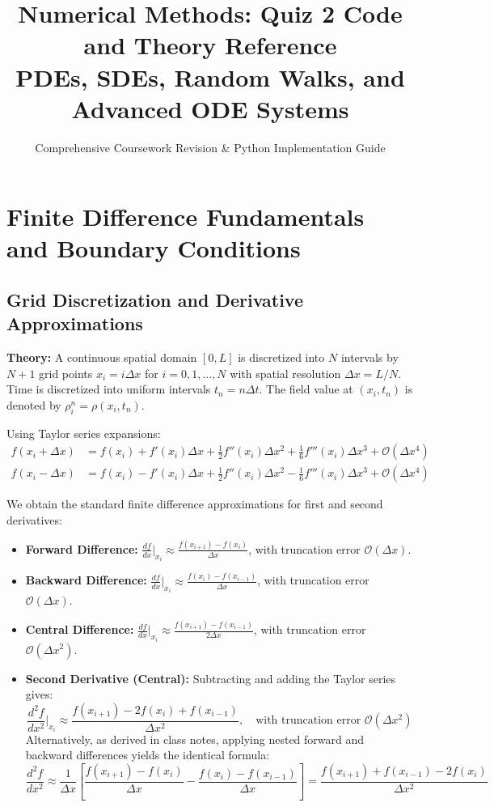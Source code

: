 \documentclass{article}
\title{\textbf{Numerical Methods: Quiz 2 Code and Theory Reference}\\\large PDEs, SDEs, Random Walks, and Advanced ODE Systems}
\author{Comprehensive Coursework Revision \& Python Implementation Guide}
\date{}
\begin{document}
\maketitle
\tableofcontents
\newpage

\section{Finite Difference Fundamentals and Boundary Conditions}

\subsection{Grid Discretization and Derivative Approximations}
\textbf{Theory:} A continuous spatial domain $[0, L]$ is discretized into $N$ intervals by $N+1$ grid points $x_i = i \Delta x$ for $i = 0, 1, \dots, N$ with spatial resolution $\Delta x = L/N$. Time is discretized into uniform intervals $t_n = n \Delta t$. The field value at $(x_i, t_n)$ is denoted by $\rho_i^n = \rho(x_i, t_n)$.

Using Taylor series expansions:
\begin{align*}
f(x_i + \Delta x) &= f(x_i) + f'(x_i)\Delta x + \frac{1}{2} f''(x_i)\Delta x^2 + \frac{1}{6} f'''(x_i)\Delta x^3 + \mathcal{O}(\Delta x^4) \\
f(x_i - \Delta x) &= f(x_i) - f'(x_i)\Delta x + \frac{1}{2} f''(x_i)\Delta x^2 - \frac{1}{6} f'''(x_i)\Delta x^3 + \mathcal{O}(\Delta x^4)
\end{align*}

We obtain the standard finite difference approximations for first and second derivatives:
\begin{itemize}
    \item \textbf{Forward Difference:} $\displaystyle \frac{df}{dx}\bigg|_{x_i} \approx \frac{f(x_{i+1}) - f(x_i)}{\Delta x}$, with truncation error $\mathcal{O}(\Delta x)$.
    \item \textbf{Backward Difference:} $\displaystyle \frac{df}{dx}\bigg|_{x_i} \approx \frac{f(x_i) - f(x_{i-1})}{\Delta x}$, with truncation error $\mathcal{O}(\Delta x)$.
    \item \textbf{Central Difference:} $\displaystyle \frac{df}{dx}\bigg|_{x_i} \approx \frac{f(x_{i+1}) - f(x_{i-1})}{2\Delta x}$, with truncation error $\mathcal{O}(\Delta x^2)$.
    \item \textbf{Second Derivative (Central):} Subtracting and adding the Taylor series gives:
    $$\frac{d^2 f}{dx^2}\bigg|_{x_i} \approx \frac{f(x_{i+1}) - 2f(x_i) + f(x_{i-1})}{\Delta x^2}, \quad \text{with truncation error } \mathcal{O}(\Delta x^2)$$
    Alternatively, as derived in class notes, applying nested forward and backward differences yields the identical formula:
    $$\frac{d^2 f}{dx^2} \approx \frac{1}{\Delta x}\left[ \frac{f(x_{i+1}) - f(x_i)}{\Delta x} - \frac{f(x_i) - f(x_{i-1})}{\Delta x} \right] = \frac{f(x_{i+1}) + f(x_{i-1}) - 2f(x_i)}{\Delta x^2}$$
\end{itemize}
\end{document}
